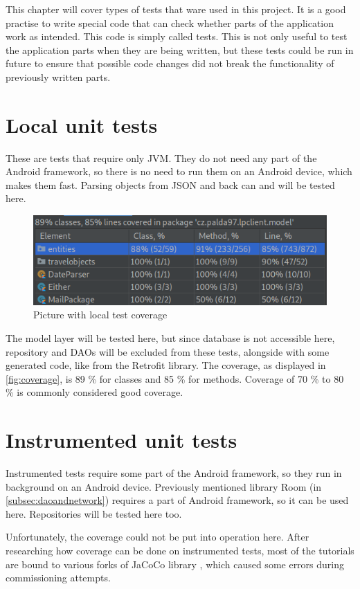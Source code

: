 This chapter will cover types of tests that ware used in this project.
It is a good practise to write special code that can check whether parts of the application work as intended.
This code is simply called tests.
This is not only useful to test the application parts when they are being written, but these tests could be run in future to ensure that possible code changes did not break the functionality of previously written parts.


\section{Local unit tests}
These are tests that require only JVM.
They do not need any part of the Android framework, so there is no need to run them on an Android device, which makes them fast.
Parsing objects from JSON and back can and will be tested here.

\begin{figure}\centering
	\includegraphics[width=1\textwidth]{pics/coverage.png}
	\caption[Test Coverage]{Picture with local test coverage}\label{fig:coverage}
\end{figure}

The model layer will be tested here, but since database is not accessible here, repository and DAOs will be excluded from these tests, alongside with some generated code, like from the Retrofit library.
The coverage, as displayed in \autoref{fig:coverage}, is 89 \% for classes and 85 \% for methods.
Coverage of 70 \% to 80 \% is commonly considered good coverage.

\section{Instrumented unit tests}
Instrumented tests require some part of the Android framework, so they run in background on an Android device.
Previously mentioned library Room (in \autoref{subsec:daoandnetwork}) requires a part of Android framework, so it can be used here.
Repositories will be tested here too.

Unfortunately, the coverage could not be put into operation here.
After researching how coverage can be done on instrumented tests, most of the tutorials are bound to various forks of JaCoCo library \cite{jacoco}, which caused some errors during commissioning attempts.
